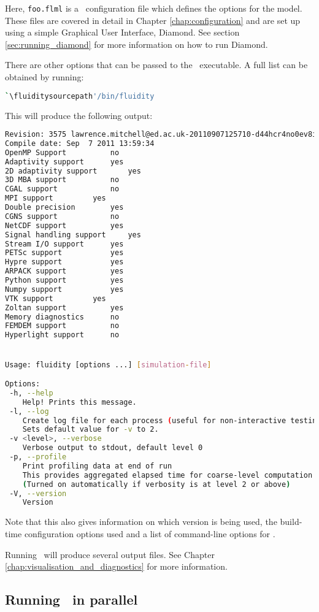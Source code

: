 Here, \lstinline[language=Bash]+foo.flml+ is a \fluidity\ configuration file
which defines the options for the model. These files are covered in detail in 
Chapter \ref{chap:configuration} and are set up using a simple Graphical User
Interface, Diamond. See section \ref{sec:running_diamond} for more information 
on how to run Diamond.

There are other options that can be passed to the \fluidity\ executable. A full
list can be obtained by running:

\begin{lstlisting}[language=bash]
`\fluiditysourcepath'/bin/fluidity
\end{lstlisting}

This will produce the following output:

\begin{lstlisting}[language=Bash]
Revision: 3575 lawrence.mitchell@ed.ac.uk-20110907125710-d44hcr4no0ev8icc
Compile date: Sep  7 2011 13:59:34
OpenMP Support			no
Adaptivity support		yes
2D adaptivity support		yes
3D MBA support			no
CGAL support			no
MPI support			yes
Double precision		yes
CGNS support			no
NetCDF support			yes
Signal handling support		yes
Stream I/O support		yes
PETSc support			yes
Hypre support			yes
ARPACK support			yes
Python support			yes
Numpy support			yes
VTK support			yes
Zoltan support			yes
Memory diagnostics		no
FEMDEM support			no
Hyperlight support		no


Usage: fluidity [options ...] [simulation-file]

Options:
 -h, --help
    Help! Prints this message.
 -l, --log
    Create log file for each process (useful for non-interactive testing).
    Sets default value for -v to 2.
 -v <level>, --verbose
    Verbose output to stdout, default level 0
 -p, --profile
    Print profiling data at end of run
    This provides aggregated elapsed time for coarse-level computation
    (Turned on automatically if verbosity is at level 2 or above)
 -V, --version
    Version
\end{lstlisting}

Note that this also gives information on which version is being used, the
build-time configuration options used and a list of command-line options for
\fluidity. 

Running \fluidity\ will produce several output files. See Chapter \ref{chap:visualisation_and_diagnostics}
for more information.

\subsection{Running \fluidity\ in parallel}
\label{sec:running_fluidity_in_parallel}

